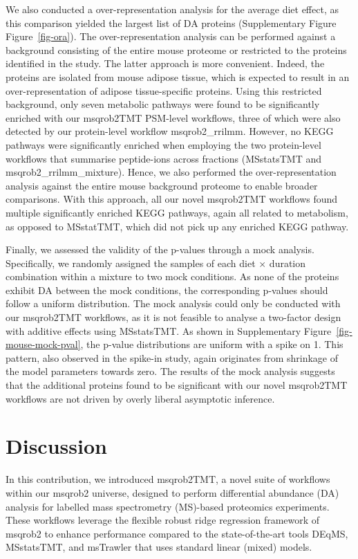 \documentclass[
  letterpaper,
  DIV=11,
  numbers=noendperiod]{scrartcl}
\begin{document}
We also conducted a over-representation analysis for the average diet
effect, as this comparison yielded the largest list of DA proteins
(Supplementary Figure Figure~\ref{fig-ora}). The over-representation
analysis can be performed against a background consisting of the entire
mouse proteome or restricted to the proteins identified in the study.
The latter approach is more convenient. Indeed, the proteins are
isolated from mouse adipose tissue, which is expected to result in an
over-representation of adipose tissue-specific proteins. Using this
restricted background, only seven metabolic pathways were found to be
significantly enriched with our msqrob2TMT PSM-level workflows, three of
which were also detected by our protein-level workflow msqrob2\_rrilmm.
However, no KEGG pathways were significantly enriched when employing the
two protein-level workflows that summarise peptide-ions across fractions
(MSstatsTMT and msqrob2\_rrilmm\_mixture). Hence, we also performed the
over-representation analysis against the entire mouse background
proteome to enable broader comparisons. With this approach, all our
novel msqrob2TMT workflows found multiple significantly enriched KEGG
pathways, again all related to metabolism, as opposed to MSstatTMT,
which did not pick up any enriched KEGG pathway.

Finally, we assessed the validity of the p-values through a mock
analysis. Specifically, we randomly assigned the samples of each diet
\(\times\) duration combination within a mixture to two mock conditions.
As none of the proteins exhibit DA between the mock conditions, the
corresponding p-values should follow a uniform distribution. The mock
analysis could only be conducted with our msqrob2TMT workflows, as it is
not feasible to analyse a two-factor design with additive effects using
MSstatsTMT. As shown in Supplementary Figure~\ref{fig-mouse-mock-pval},
the p-value distributions are uniform with a spike on 1. This pattern,
also observed in the spike-in study, again originates from shrinkage of
the model parameters towards zero. The results of the mock analysis
suggests that the additional proteins found to be significant with our
novel msqrob2TMT workflows are not driven by overly liberal asymptotic
inference.

\section{Discussion}

In this contribution, we introduced msqrob2TMT, a novel suite of
workflows within our msqrob2 universe, designed to perform differential
abundance (DA) analysis for labelled mass spectrometry (MS)-based
proteomics experiments. These workflows leverage the flexible robust
ridge regression framework of msqrob2 to enhance performance compared to
the state-of-the-art tools DEqMS, MSstatsTMT, and msTrawler that uses
standard linear (mixed) models.
\end{document}

